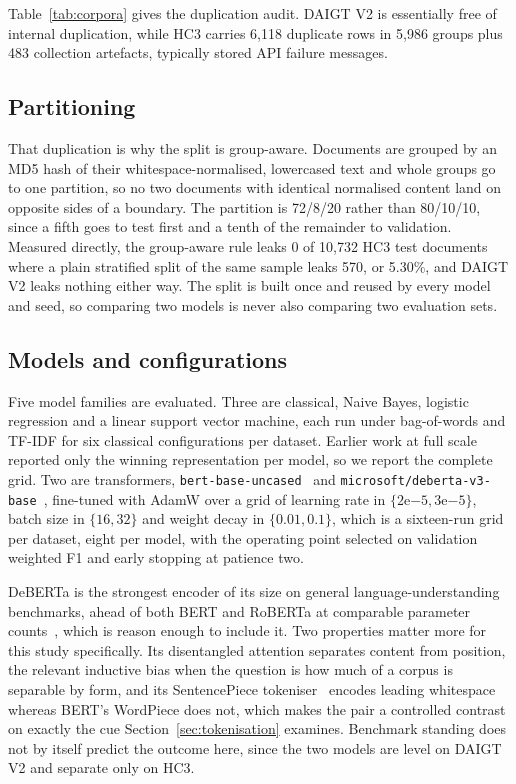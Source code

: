 Table~\ref{tab:corpora} gives the duplication audit. DAIGT V2 is essentially free of internal duplication, while HC3 carries 6,118 duplicate rows in 5,986 groups plus 483 collection artefacts, typically stored API failure messages.

\subsection{Partitioning}

That duplication is why the split is group-aware. Documents are grouped by an MD5 hash of their whitespace-normalised, lowercased text and whole groups go to one partition, so no two documents with identical normalised content land on opposite sides of a boundary. The partition is 72/8/20 rather than 80/10/10, since a fifth goes to test first and a tenth of the remainder to validation. Measured directly, the group-aware rule leaks 0 of 10,732 HC3 test documents where a plain stratified split of the same sample leaks 570, or 5.30\%, and DAIGT V2 leaks nothing either way. The split is built once and reused by every model and seed, so comparing two models is never also comparing two evaluation sets.

\subsection{Models and configurations}

Five model families are evaluated. Three are classical, Naive Bayes, logistic regression and a linear support vector machine, each run under bag-of-words and TF-IDF for six classical configurations per dataset. Earlier work at full scale reported only the winning representation per model, so we report the complete grid. Two are transformers, \texttt{bert-base-uncased}~\cite{Devlin2019bert} and \texttt{microsoft/deberta-v3-base}~\cite{He2023debertav3}, fine-tuned with AdamW over a grid of learning rate in $\{2\mathrm{e}{-5}, 3\mathrm{e}{-5}\}$, batch size in $\{16, 32\}$ and weight decay in $\{0.01, 0.1\}$, which is a sixteen-run grid per dataset, eight per model, with the operating point selected on validation weighted F1 and early stopping at patience two.

DeBERTa is the strongest encoder of its size on general language-understanding benchmarks, ahead of both BERT and RoBERTa at comparable parameter counts~\cite{He2023debertav3}, which is reason enough to include it. Two properties matter more for this study specifically. Its disentangled attention separates content from position, the relevant inductive bias when the question is how much of a corpus is separable by form, and its SentencePiece tokeniser~\cite{Kudo2018sentencepiece} encodes leading whitespace whereas BERT's WordPiece does not, which makes the pair a controlled contrast on exactly the cue Section~\ref{sec:tokenisation} examines. Benchmark standing does not by itself predict the outcome here, since the two models are level on DAIGT V2 and separate only on HC3.

